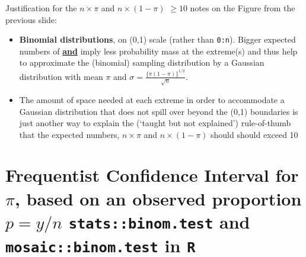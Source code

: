 \documentclass[10pt,handout]{beamer}\usepackage[]{graphicx}\usepackage[]{color}
\begin{document}
\begin{frame}
\end{frame}



\begin{frame}{Justification for the $n \times \pi$ and $n \times (1-\pi)$ $\geq 10$ }
	notes on the Figure from the previous slide:
	\begin{itemize}
		\setlength\itemsep{1em}
		\item \textbf{Binomial distributions}, on (0,1) scale (rather than \texttt{0:n}). Bigger  expected numbers of {  } \textbf{\underline{and}} { } imply less probability mass at the extreme(s) and thus help to approximate the (binomial) sampling distribution by a Gaussian distribution with mean $\pi$ and 
		$\sigma = \frac{ \{\pi(1-\pi)\}^{1/2}}{\sqrt{n}}.$
		\item The amount of space needed at each extreme in order to accommodate a Gaussian distribution that does not spill over beyond the (0,1) boundaries is just another way to explain the (`taught but not explained')  rule-of-thumb that the expected numbers, $n \times \pi$ and $n \times (1-\pi)$ should should exceed 10 
	\end{itemize}
\end{frame}


\section{Frequentist Confidence Interval for $\pi$, based on an observed proportion $p = y/n$ \texttt{stats::binom.test} and \texttt{mosaic::binom.test} in \texttt{R}}
\end{document}
